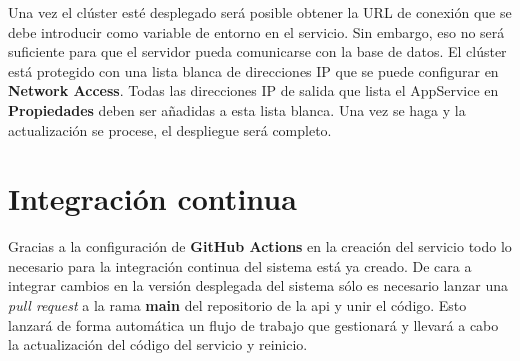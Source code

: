 Una vez el clúster esté desplegado será posible obtener la URL de conexión que se debe introducir como variable de entorno en el servicio. Sin embargo, eso no será suficiente para que el servidor pueda comunicarse con la base de datos. El clúster está protegido con una lista blanca de direcciones IP que se puede configurar en \textbf{Network Access}. Todas las direcciones IP de salida que lista el AppService en \textbf{Propiedades} deben ser añadidas a esta lista blanca. Una vez se haga y la actualización se procese, el despliegue será completo.

\section{Integración continua}

Gracias a la configuración de \textbf{GitHub Actions} en la creación del servicio todo lo necesario para la integración continua del sistema está ya creado. De cara a integrar cambios en la versión desplegada del sistema sólo es necesario lanzar una \emph{pull request} a la rama \textbf{main} del repositorio de la \acrshort{api} y unir el código. Esto lanzará de forma automática un flujo de trabajo que gestionará y llevará a cabo la actualización del código del servicio y reinicio.